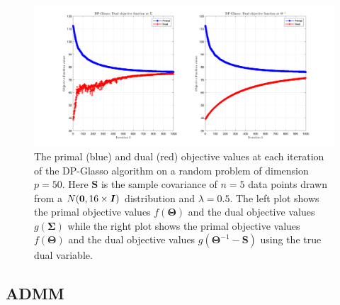 \documentclass[10pt, letterpaper]{article}
\newcommand{\cov}{\boldsymbol \Sigma}
\newcommand{\preci}{\boldsymbol \Theta}
\newcommand{\sampcov}{\boldsymbol S} %
\newcommand{\eye}{\boldsymbol I} %
\newcommand{\bzero}{{\bf 0}}
\begin{document}
\begin{figure}
\centering
\includegraphics[width=\textwidth]{plots/dpglasso_primaldual.png}
\caption{The primal (blue) and dual (red) objective values at each iteration of the DP-Glasso algorithm on a random problem of dimension $p=50$.  Here $\sampcov$ is the sample covariance of $n=5$ data points drawn from a $N(\bzero, 16\times \eye)$ distribution and $\lambda = 0.5$.  The left plot shows the primal objective values $f(\preci)$ and the dual objective values $g(\cov)$ while the right plot shows the primal objective values $f(\preci)$ and the dual objective values $g(\preci^{-1}-\sampcov)$ using the true dual variable.}
\label{fig:dpglasso_primaldual}
\end{figure}







\subsection{ADMM}
\end{document}
